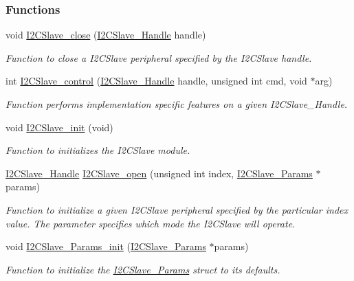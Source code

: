 \subsubsection*{Functions}
\begin{DoxyCompactItemize}
\item 
void \hyperlink{_i2_c_slave_8h_a323cbb394c10ab1018820c9a76eccc18}{I2\+C\+Slave\+\_\+close} (\hyperlink{_i2_c_slave_8h_a302d775f802ff66ed2ca05e1956f738e}{I2\+C\+Slave\+\_\+\+Handle} handle)
\begin{DoxyCompactList}\small\item\em Function to close a I2\+C\+Slave peripheral specified by the I2\+C\+Slave handle. \end{DoxyCompactList}\item 
int \hyperlink{_i2_c_slave_8h_abcd38688f29738ee33b1748a42a3b140}{I2\+C\+Slave\+\_\+control} (\hyperlink{_i2_c_slave_8h_a302d775f802ff66ed2ca05e1956f738e}{I2\+C\+Slave\+\_\+\+Handle} handle, unsigned int cmd, void $\ast$arg)
\begin{DoxyCompactList}\small\item\em Function performs implementation specific features on a given I2\+C\+Slave\+\_\+\+Handle. \end{DoxyCompactList}\item 
void \hyperlink{_i2_c_slave_8h_ad7518283a3f3fb80cefe6cb7ca7a4a36}{I2\+C\+Slave\+\_\+init} (void)
\begin{DoxyCompactList}\small\item\em Function to initializes the I2\+C\+Slave module. \end{DoxyCompactList}\item 
\hyperlink{_i2_c_slave_8h_a302d775f802ff66ed2ca05e1956f738e}{I2\+C\+Slave\+\_\+\+Handle} \hyperlink{_i2_c_slave_8h_abdfc770ace6accbf91b91f3e195e7119}{I2\+C\+Slave\+\_\+open} (unsigned int index, \hyperlink{struct_i2_c_slave___params}{I2\+C\+Slave\+\_\+\+Params} $\ast$params)
\begin{DoxyCompactList}\small\item\em Function to initialize a given I2\+C\+Slave peripheral specified by the particular index value. The parameter specifies which mode the I2\+C\+Slave will operate. \end{DoxyCompactList}\item 
void \hyperlink{_i2_c_slave_8h_a3c29bf7436be17348ea73fabb6ede3ae}{I2\+C\+Slave\+\_\+\+Params\+\_\+init} (\hyperlink{struct_i2_c_slave___params}{I2\+C\+Slave\+\_\+\+Params} $\ast$params)
\begin{DoxyCompactList}\small\item\em Function to initialize the \hyperlink{struct_i2_c_slave___params}{I2\+C\+Slave\+\_\+\+Params} struct to its defaults. \end{DoxyCompactList}\item 

\end{DoxyCompactItemize}
